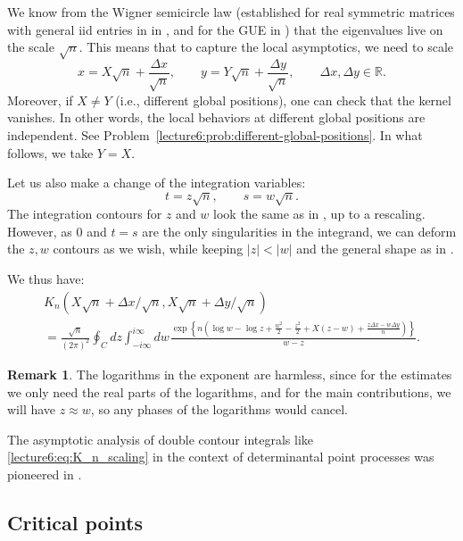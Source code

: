 \documentclass[letterpaper,11pt,oneside,reqno]{book}
\numberwithin{equation}{chapter}  %
\newcommand{\ssp}{\hspace{1pt}}
\theoremstyle{definition}
\newtheorem{remark}[proposition]{Remark}
\begin{document}
We know from the Wigner semicircle law
(established for real symmetric matrices with general iid entries in
in ,
and for the GUE in )
that the eigenvalues live on the scale $\sqrt n$. This means that to capture the local asymptotics,
we need to scale
\begin{equation}
	\label{lecture6:eq:scaling_x-y}
	x=X\sqrt n+\frac{\Delta x}{\sqrt n},\qquad y=Y\sqrt n+\frac{\Delta y}{\sqrt n},\qquad
	\Delta x,\Delta y\in\mathbb{R}.
\end{equation}
Moreover, if $X\ne Y$ (i.e., different global positions), one can check that the kernel
vanishes. In other words, the local behaviors at different global positions are independent.
See Problem~\ref{lecture6:prob:different-global-positions}.
In what follows, we take $Y=X$.

Let us also make a change of the integration variables:
\begin{equation*}
	t=z\sqrt n,\qquad s=w\sqrt n.
\end{equation*}
The integration contours for $z$ and $w$ look the same as in
, up to a rescaling. However, as $0$
and $t=s$
are the only singularities in the integrand, we can deform the $z,w$
contours as we wish, while keeping $|z|<|w|$
and the general shape as in .

We thus have:
\begin{multline}
	\label{lecture6:eq:K_n_scaling}
	K_n(X\sqrt n+\Delta x/\sqrt n,X\sqrt n+\Delta y/\sqrt n)\\=
	\frac{\sqrt n}{(2\pi)^2}
	\oint_C dz\int_{-i\infty}^{i\infty}dw\ssp
	\frac{\exp
		\left\{
			n\left(
				\log w -\log z
				+\frac{w^2}{2}-\frac{z^2}{2}
				+X(z-w)+\frac{z \Delta x-w \Delta y}{n}
			\right)
		\right\}
	}{w-z}.
\end{multline}
\begin{remark}
	\label{lecture6:rmk:log-harmless}
	The logarithms in the exponent are harmless, since for the
	estimates we only need the real parts of the logarithms,
	and for the main contributions, we will have $z\approx w$, so
	any phases of the logarithms would cancel.
\end{remark}

The asymptotic analysis of double contour integrals like
\eqref{lecture6:eq:K_n_scaling} in the context of determinantal point processes
was pioneered in \cite[Section~3]{Okounkov2002}.

\subsection{Critical points}
\label{lecture6:sub:critical-points}
\end{document}
